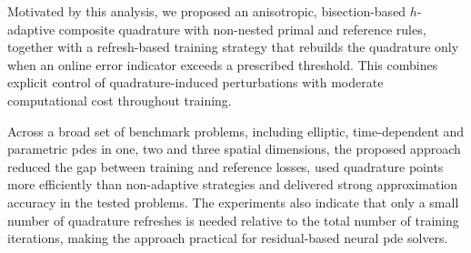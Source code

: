 \documentclass[oneside,reqno,11pt,a4paper]{amsart}
\theoremstyle{definition}
\begin{document}
Motivated by this analysis, we proposed an anisotropic, bisection-based
$h$-adaptive composite quadrature with non-nested primal and reference rules,
together with a refresh-based training strategy that rebuilds the quadrature
only when an online error indicator exceeds a prescribed threshold. This
combines explicit control of quadrature-induced perturbations with moderate
computational cost throughout training.

Across a broad set of benchmark problems, including elliptic, time-dependent
and parametric \acp{pde} in one, two and three spatial dimensions, the
proposed approach reduced the gap between training and reference losses, used
quadrature points more efficiently than non-adaptive strategies and delivered
strong approximation accuracy in the tested problems. The experiments also
indicate that only a small number of quadrature refreshes is needed relative to
the total number of training iterations, making the approach practical for
residual-based neural \ac{pde} solvers.

\printbibliography 
\end{document}
